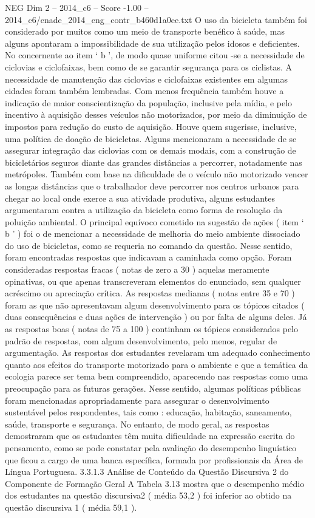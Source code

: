 \begin{textsample}{NEG Dim 2 – 2014\_c6 – Score -1.00 – 2014\_c6/enade\_2014\_eng\_contr\_b460d1a0ee.txt}
O uso da bicicleta também foi considerado por muitos como um meio de transporte benéfico à saúde, mas alguns apontaram a impossibilidade de sua utilização pelos idosos e deficientes.
No concernente ao item ‘ b ’, de modo quase uniforme citou -se a necessidade de ciclovias e ciclofaixas, bem como de se garantir segurança para os ciclistas.
A necessidade de manutenção das ciclovias e ciclofaixas existentes em algumas cidades foram também lembradas.
Com menos frequência também houve a indicação de maior conscientização da população, inclusive pela mídia, e pelo incentivo à aquisição desses veículos não motorizados, por meio da diminuição de impostos para redução do custo de aquisição.
Houve quem sugerisse, inclusive, uma política de doação de bicicletas.
Alguns mencionaram a necessidade de se assegurar integração das ciclovias com os demais modais, com a construção de bicicletários seguros diante das grandes distâncias a percorrer, notadamente nas metrópoles.
Também com base na dificuldade de o veículo não motorizado vencer as longas distâncias que o trabalhador deve percorrer nos centros urbanos para chegar ao local onde exerce a sua atividade produtiva, alguns estudantes argumentaram contra a utilização da bicicleta como forma de resolução da poluição ambiental.
O principal equívoco cometido na sugestão de ações ( item ‘ b ’ ) foi o de mencionar a necessidade de melhoria do meio ambiente dissociado do uso de bicicletas, como se requeria no comando da questão.
Nesse sentido, foram encontradas respostas que indicavam a caminhada como opção.
Foram consideradas respostas fracas ( notas de zero a 30 ) aquelas meramente opinativas, ou que apenas transcreveram elementos do enunciado, sem qualquer acréscimo ou apreciação crítica.
As respostas medianas ( notas entre 35 e 70 ) foram as que não apresentavam algum desenvolvimento para os tópicos citados ( duas consequências e duas ações de intervenção ) ou por falta de alguns deles.
Já as respostas boas ( notas de 75 a 100 ) continham os tópicos considerados pelo padrão de respostas, com algum desenvolvimento, pelo menos, regular de argumentação.
As respostas dos estudantes revelaram um adequado conhecimento quanto aos efeitos do transporte motorizado para o ambiente e que a temática da ecologia parece ser tema bem compreendido, aparecendo nas respostas como uma preocupação para as futuras gerações.
Nesse sentido, algumas políticas públicas foram mencionadas apropriadamente para assegurar o desenvolvimento sustentável pelos respondentes, tais como : educação, habitação, saneamento, saúde, transporte e segurança.
No entanto, de modo geral, as respostas demostraram que os estudantes têm muita dificuldade na expressão escrita do pensamento, como se pode constatar pela avaliação do desempenho linguístico que ficou a cargo de uma banca específica, formada por profissionais da Área de Língua Portuguesa. 3.3.1.3 Análise de Conteúdo da Questão Discursiva 2 do Componente de Formação Geral A Tabela 3.13 mostra que o desempenho médio dos estudantes na questão discursiva2 ( média 53,2 ) foi inferior ao obtido na questão discursiva 1 ( média 59,1 ).

\end{textsample}
